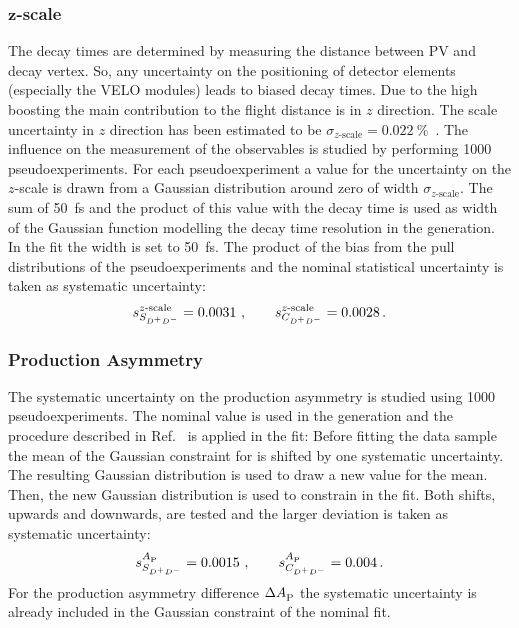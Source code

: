 
\subsubsection[\texorpdfstring{$z$}{z}-scale]{\texorpdfstring{$\boldsymbol{z}$}{z}-scale}
\label{sec:b02dd:systematics:z_scale}

The decay times are determined by measuring the distance between PV and decay
vertex. So, any uncertainty on the positioning of detector elements
(especially the VELO modules) leads to biased decay times. Due to the high
boosting the main contribution to the flight distance is in $z$ direction. The
scale uncertainty in $z$ direction has been estimated to be
$\sigma_{z\text{-scale}} = \SI{0.022}{\percent}$~\cite{LHCb-ANA-2011-055}. The
influence on the measurement of the \CP observables is studied by performing
\num{1000} pseudoexperiments. For each pseudoexperiment a value for the uncertainty
on the $z$-scale is drawn from a Gaussian distribution around zero of width
$\sigma_{z\text{-scale}}$. The sum of \SI{50}{\fs} and the product of this
value with the decay time is used as width of the Gaussian function modelling
the decay time resolution in the generation. In the fit the width is set to
\SI{50}{\fs}. The product of the bias from the pull distributions of the
pseudoexperiments and the nominal statistical uncertainty is taken as
systematic uncertainty:
\begin{align*}
s_{S_{{{D}^+}{{D}^-}}}^{z\text{-scale}} = \num{0.0031}\ , \qquad s_{C_{{{D}^+}{{D}^-}}}^{z\text{-scale}} = \num{0.0028}\,.
\end{align*}

\subsubsection{Production Asymmetry}
\label{sec:b02dd:systematics:production_asymmetry}

The systematic uncertainty on the production asymmetry  is
studied using \num{1000} pseudoexperiments. The nominal value is used in the
generation and the procedure described in Ref.~\cite{Karbach:1490463} is
applied in the fit: Before fitting the data sample the mean of the Gaussian
constraint for  is shifted by one systematic uncertainty. The
resulting Gaussian distribution is used to draw a new value for the mean.
Then, the new Gaussian distribution is used to constrain  in the
fit. Both shifts, upwards and downwards, are tested and the larger deviation
is taken as systematic uncertainty:
%
\begin{align*}
s_{S_{{{D}^+}{{D}^-}}}^{A_\text{P}^{}} = \num{0.0015}\ , \qquad s_{C_{{{D}^+}{{D}^-}}}^{A_\text{P}^{}} = \num{0.004}\,.
\end{align*}
%
For the production asymmetry difference $\Delta A_\text{P}^{}$ the systematic
uncertainty is already included in the Gaussian constraint of the nominal fit.

